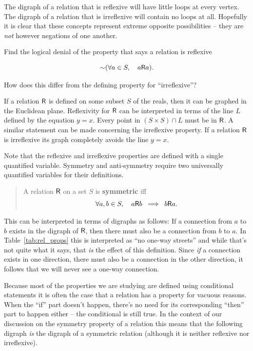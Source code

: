 The digraph of a relation that is reflexive will have little loops at every vertex.
The digraph of a relation that is irreflexive will contain no loops at all.
Hopefully it is clear that these concepts represent extreme opposite possibilities --
they are \emph{not} however negations of one another.

\begin{exer}
Find the logical denial of the property that says a relation is reflexive

\[ {\sim}(\forall a \in S, \quad a \mbox{\textsf R} a). \]

How does this differ from the defining property for ``irreflexive''?
\end{exer}

If a relation $\mbox{\textsf R}$ is defined on some subset $S$ of the reals, then it can be graphed
in the Euclidean plane.  Reflexivity for $\mbox{\textsf R}$ can be interpreted in terms of the line
$L$ defined by the equation $y=x$.  Every point in $(S \times S) \cap L$
must be in $\mbox{\textsf R}$.  A similar statement can be made concerning the irreflexive property.
If a relation $\mbox{\textsf R}$ is irreflexive its graph completely avoids the line $y=x$.

Note that the reflexive and irreflexive properties are defined with a single quantified
variable.  Symmetry and anti-symmetry require two universally quantified variables for
their definitions.

\begin{quote}
A relation $\mbox{\textsf R}$ on a set $S$ is {\bf symmetric} iff
\[ \forall a,b \in S, \quad a \mbox{\textsf R} b \; \implies \; b \mbox{\textsf R} a. \] 
\end{quote}

\noindent This can be interpreted in terms of digraphs as follows:  If a connection
from $a$ to $b$ exists in the digraph of $\mbox{\textsf R}$, then there must also be a connection
from $b$ to $a$.   In Table~\ref{tab:rel_props} this is interpreted as ``no one-way streets''
and while that's not quite what it says, that \emph{is} the effect of this definition.
Since \emph{if} a connection exists in one direction, there must also be a connection 
in the other direction, it follows that we will never see a one-way connection.

Because most of the properties we are studying are defined using conditional statements
it is often the case that a relation has a property for vacuous reasons.  When the ``if'' part
doesn't happen, there's no need for its corresponding ``then'' part to happen either -- the 
conditional is still true.  In the context of our discussion on the symmetry property of
a relation this means that the following digraph \emph{is} the digraph of a symmetric
relation (although it is neither reflexive nor irreflexive).

